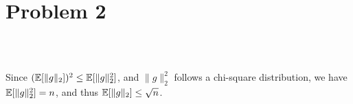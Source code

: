 \section{Problem 2}~\label{sec:prob2}

\subsection{} %

Since $({\mathbb{E}}[\|g\|_2])^2 \le {\mathbb{E}}[\|g\|_2^2]$,
and $\|g\|_2^2$ follows a chi-square distribution,
we have ${\mathbb{E}}[\|g\|_2^2]=n$,
and thus ${\mathbb{E}}[\|g\|_2]\le \sqrt{n}$.

\subsection{} %


